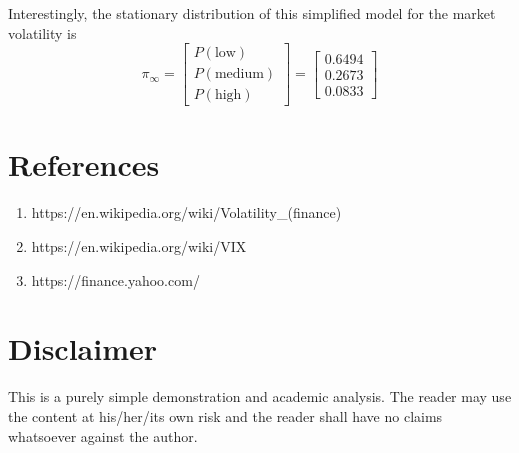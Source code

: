 \documentclass[a4paper, 11pt]{article}
\begin{document}
Interestingly, the stationary distribution of this simplified model for the market volatility is 
\begin{equation}
\pi_\infty = \begin{bmatrix}
P(\text{low})\\
P(\text{medium})\\
P(\text{high})
\end{bmatrix} = \begin{bmatrix}
0.6494 \\
0.2673 \\
0.0833
\end{bmatrix}
\end{equation}




\section*{References}
\begin{enumerate}
\item https://en.wikipedia.org/wiki/Volatility\_(finance)
\item https://en.wikipedia.org/wiki/VIX
\item https://finance.yahoo.com/
\end{enumerate}


\section*{Disclaimer}
This is a purely simple demonstration and academic analysis. The reader may use the content at his/her/its own risk and the reader shall have no claims whatsoever against the author. 
\end{document}
